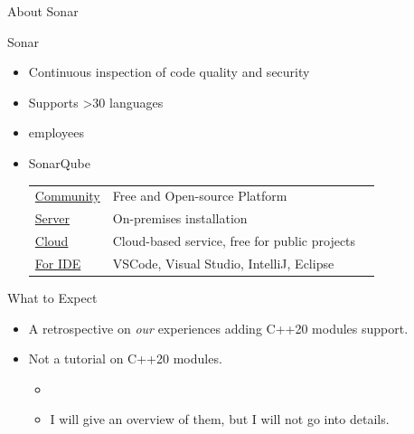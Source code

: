 \documentclass[]{beamer}
\begin{document}
\begin{frame}{About Sonar}
  \begin{block}{Sonar}
    \begin{itemize}
      \item Continuous inspection of code quality and security
      \item Supports >30 languages
      \item {} employees      
      \item SonarQube \\
            \vspace{0.5em}
            \small \begin{tabular}{l l r}
              \href{https://www.sonarsource.com/open-source-editions/sonarqube-community-edition/}{Community} & Free and Open-source Platform                 &                                                           \\ \vspace{0.2em}
              \href{https://www.sonarsource.com/products/sonarqube/}{Server}                                  & On-premises installation                      & \raisebox{-.25\height}{} \\ \vspace{0.2em}
              \href{https://sonarcloud.io/login}{Cloud}                                                       & Cloud-based service, free for public projects & \raisebox{-.25\height}{} \\ \vspace{0.2em}
              \href{https://www.sonarsource.com/products/sonarlint/}{For IDE}                                 & VSCode, Visual Studio, IntelliJ, Eclipse      & \raisebox{-.25\height}{} \\
            \end{tabular}
    \end{itemize}
  \end{block}
\end{frame}

\begin{frame}{What to Expect}
  \begin{block}{}
    \begin{itemize}
      \item A retrospective on \emph{our} experiences adding C++20 modules support.
      \item Not a tutorial on C++20 modules.
            \begin{itemize}
              \item \cite{Weis24}
              \item I will give an overview of them, but I will not go into details.
            \end{itemize}
    \end{itemize}
  \end{block}
\end{frame}
\end{document}
